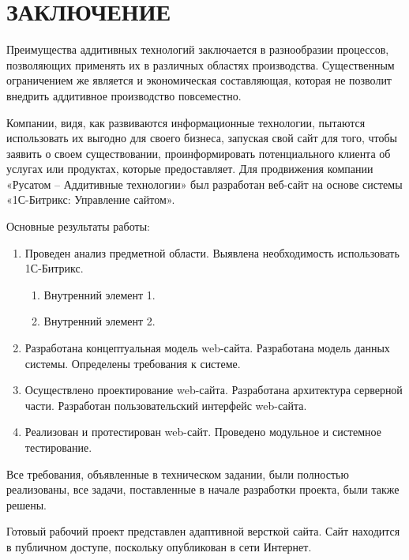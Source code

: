 \section*{ЗАКЛЮЧЕНИЕ}

Преимущества аддитивных технологий заключается в разнообразии процессов, позволяющих применять их в различных областях производства. Существенным ограничением же является и экономическая составляющая, которая не позволит внедрить аддитивное производство повсеместно.
  
Компании, видя, как развиваются информационные технологии, пытаются использовать их выгодно для своего бизнеса, запуская свой сайт для того, чтобы заявить о своем существовании, проинформировать потенциального клиента об услугах или продуктах, которые предоставляет. 
Для продвижения компании «Русатом – Аддитивные технологии» был разработан веб-сайт на основе системы «1С-Битрикс: Управление сайтом».

Основные результаты работы:

\begin{enumerate}
\item Проведен анализ предметной области. Выявлена необходимость использовать 1С-Битрикс.
  \begin{enumerate}
    \item Внутренний элемент 1.
    \item Внутренний элемент 2.
\end{enumerate}
\item Разработана концептуальная модель web-сайта. Разработана модель данных системы. Определены требования к системе.
\item Осуществлено проектирование web-сайта. Разработана архитектура серверной части. Разработан пользовательский интерфейс web-сайта.
\item Реализован и протестирован web-сайт. Проведено модульное и системное тестирование.
\end{enumerate}

Все требования, объявленные в техническом задании, были полностью реализованы, все задачи, поставленные в начале разработки проекта, были также решены.

Готовый рабочий проект представлен адаптивной версткой сайта. Сайт находится в публичном доступе, поскольку опубликован в сети Интернет.  
